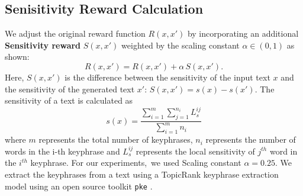 \subsection{Senisitivity Reward Calculation}
\label{appendix:sensitvity_reward_calc}
We adjust the original reward function $R(x, x')$ by incorporating an additional \textbf{Sensitivity reward} $S(x, x')$ weighted by the scaling constant $\alpha \in (0, 1)$ as shown:
\begin{equation}
    R(x, x') = R(x, x') + \alpha \, S(x, x').
\end{equation}
Here, $S(x, x')$ is the difference between the sensitivity of the input text $x$ and the sensitivity of the generated text 
$x'$: $S(x, x') = s(x) - s(x')$.
The sensitivity of a text is calculated as 
\begin{equation}
    s(x) = \frac{\sum_{i=1}^{m} \sum_{j=1}^{n_i} L_{s}^{ij}}{\sum_{i=1}^{m} n_i}
\end{equation}
where ${m}$ represents the total number of keyphrases, ${n_i}$ represents the number of words in the i-th keyphrase and $L_{s}^{ij}$ represents the local sensitivity of $j^{th}$ word in the $i^{th}$ keyphrase. For our experiments, we used Scaling constant $\alpha = 0.25$. We extract the keyphrases from a text using a TopicRank keyphrase extraction model using an open source toolkit \texttt{pke} \cite{boudin:2016:COLINGDEMO}.


